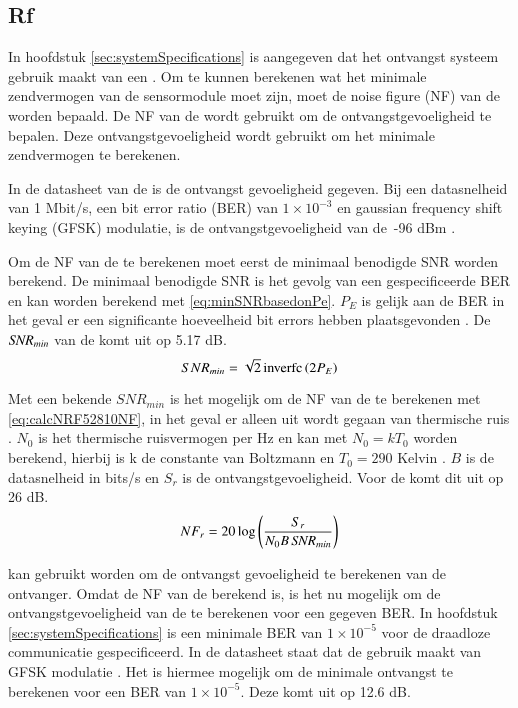 \subsection{Rf} \label{sec:ontwerp:Rf}
In hoofdstuk \ref{sec:systemSpecifications} is aangegeven dat het ontvangst systeem gebruik maakt van een \mcu. Om te kunnen berekenen wat het minimale zendvermogen van de sensormodule moet zijn, moet de noise figure (NF) van de \mcu worden bepaald. De NF van de \mcu wordt gebruikt om de ontvangstgevoeligheid te bepalen. Deze ontvangstgevoeligheid wordt gebruikt om het minimale zendvermogen te berekenen.

In de datasheet van de \mcu is de ontvangst gevoeligheid gegeven. Bij een datasnelheid van 1 Mbit/s, een bit error ratio (BER) van  $1 \times 10^{-3}$ en gaussian frequency shift keying (GFSK) modulatie, is de ontvangstgevoeligheid van de \mcu$\,$-96 dBm \cite{nrf52810}.

Om de NF van de \mcu te berekenen moet eerst de minimaal benodigde SNR worden berekend. De minimaal benodigde SNR is het gevolg van een gespecificeerde BER en kan worden berekend met \cref{eq:minSNRbasedonPe}. $P_E$ is gelijk aan de BER in het geval er een significante hoeveelheid bit errors hebben plaatsgevonden \cite{BERtoPe}. De $\mbox{\textit{SNR}}_{min}$ van de \mcu komt uit op 5.17 dB.
\begin{equation}\label{eq:minSNRbasedonPe}
    SNR_{min}=\sqrt{2}\inverfc\left(2P_E\right)
    \tagaddtext{[\si{\decibel}]}
\end{equation}

Met een bekende $SNR_{min}$ is het mogelijk om de NF van de \mcu te berekenen met \cref{eq:calcNRF52810NF}, in het geval er alleen uit wordt gegaan van thermische ruis \cite{SWRA030}. $N_0$ is het thermische ruisvermogen per Hz en kan met $N_0=kT_0$ worden berekend, hierbij is k de constante van Boltzmann en $T_0=290$ Kelvin \cite{Short-rangeWirelessCommunication}. $B$ is de datasnelheid in bits/s en $S_r$ is de ontvangstgevoeligheid. Voor de \mcu komt dit uit op 26 dB.
\begin{equation}\label{eq:calcNRF52810NF}
    NF_r=20\log\left(\frac{S_{r}}{N_0B\,\SNR_{min}}\right)
    \tagaddtext{[\si{\decibel}]}
\end{equation}

 kan gebruikt worden om de ontvangst gevoeligheid te berekenen van de ontvanger. Omdat de NF van de \mcu berekend is, is het nu mogelijk om de ontvangstgevoeligheid van de \mcu te berekenen voor een gegeven BER. In hoofdstuk \ref{sec:systemSpecifications} is een minimale BER van $1\times10^{-5}$ voor de draadloze communicatie gespecificeerd. In de datasheet staat dat de \mcu gebruik maakt van GFSK modulatie \cite{nrf52810}. Het is hiermee mogelijk om de minimale ontvangst \SNR te berekenen voor een BER van $1\times10^{-5}$. Deze komt uit op 12.6 dB.

